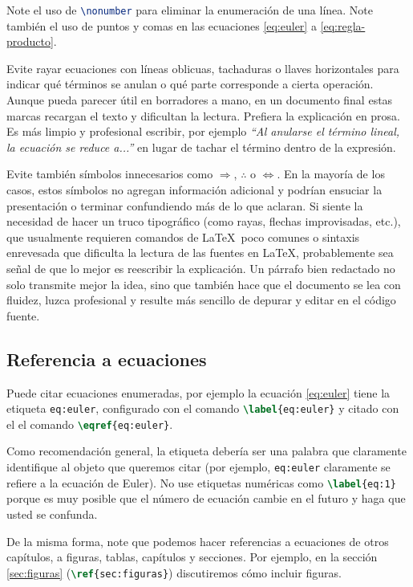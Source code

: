 \documentclass[../portafolio.tex]{subfiles}
\begin{document}
Note el uso de \lstinline[language=TeX]!\nonumber! para eliminar la enumeración de una
línea. Note también el uso de puntos y comas en las ecuaciones
\eqref{eq:euler} a \eqref{eq:regla-producto}.

Evite rayar ecuaciones con líneas oblicuas, tachaduras o llaves
horizontales para indicar qué términos se anulan o qué parte
corresponde a cierta operación. Aunque pueda parecer útil en
borradores a mano, en un documento final estas marcas recargan el
texto y dificultan la lectura. Prefiera la explicación en prosa. Es
más limpio y profesional escribir, por ejemplo \textit{``Al anularse
  el término lineal, la ecuación se reduce a...''}  en lugar de tachar
el término dentro de la expresión.

Evite también símbolos innecesarios como $\Rightarrow$, $\therefore$ o
$\Leftrightarrow$. En la mayoría de los casos, estos símbolos no
agregan información adicional y podrían ensuciar la presentación o
terminar confundiendo más de lo que aclaran. Si siente la necesidad de
hacer un truco tipográfico (como rayas, flechas improvisadas, etc.),
que usualmente requieren comandos de \LaTeX\ poco comunes o sintaxis
enrevesada que dificulta la lectura de las fuentes en \LaTeX,
probablemente sea señal de que lo mejor es reescribir la
explicación. Un párrafo bien redactado no solo transmite mejor la
idea, sino que también hace que el documento se lea con fluidez, luzca
profesional y resulte más sencillo de depurar y editar en el código
fuente.

\subsection{Referencia a ecuaciones}


Puede citar ecuaciones enumeradas, por ejemplo la ecuación
\eqref{eq:euler} tiene la etiqueta \lstinline[language=TeX]!eq:euler!, configurado con el comando \lstinline[language=TeX]!\label{eq:euler}! y citado con el el comando \lstinline[language=TeX]!\eqref{eq:euler}!.

Como recomendación general, la etiqueta debería ser una palabra que
claramente identifique al objeto que queremos citar (por ejemplo,
\lstinline[language=TeX]!eq:euler! claramente se refiere a la ecuación
de Euler). No use etiquetas numéricas como
\lstinline[language=TeX]!\label{eq:1}! porque es muy posible que el
número de ecuación cambie en el futuro y haga que usted se confunda.

De la misma forma, note que podemos hacer referencias a ecuaciones de
otros capítulos, a figuras, tablas, capítulos y secciones. Por ejemplo, en la
sección \ref{sec:figuras}
(\lstinline[language=TeX]!\ref{sec:figuras}!) discutiremos cómo
incluir figuras.
\end{document}
